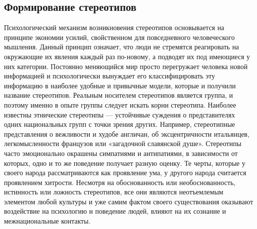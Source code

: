 \documentclass[14pt, a4paper] {ncc}
\begin{document}
	\subsection{Формирование стереотипов}
        Психологический механизм возникновения стереотипов основывается на
        принципе экономии усилий, свойственном для повседневного человеческого
        мышления. Данный принцип означает, что люди не стремятся реагировать на
        окружающие их явления каждый раз по-новому, а подводят их под имеющиеся
        у них категории. Постоянно меняющийся мир просто перегружает человека
        новой информацией и психологически вынуждает его классифицировать эту
        информацию в наиболее удобные и привычные модели, которые и получили название
        стереотипов. Реальным носителем стереотипов является группа, и поэтому именно
        в опыте группы следует искать корни стереотипа. Наиболее известны этнические
        стереотипы — устойчивые суждения о представителях одних национальных групп
        с точки зрения других. Например, стереотипные представления о вежливости и
        худобе англичан, об эксцентричности итальянцев, легкомысленности французов
        или «загадочной славянской душе». Стереотипы часто эмоционально окрашены
        симпатиями и антипатиями, в зависимости от которых, одно и то же поведение
        получает разную оценку. Те черты, которые у своего народа рассматриваются как
        проявление ума, у другого народа считается проявлением хитрости. Несмотря на
        обоснованность или необоснованность, истинность или ложность стереотипов,
        все они являются неотъемлемым элементом любой культуры и уже самим фактом
        своего существования оказывают воздействие на психологию и поведение людей,
        влияют на их сознание и межнациональные контакты.
\end{document}
